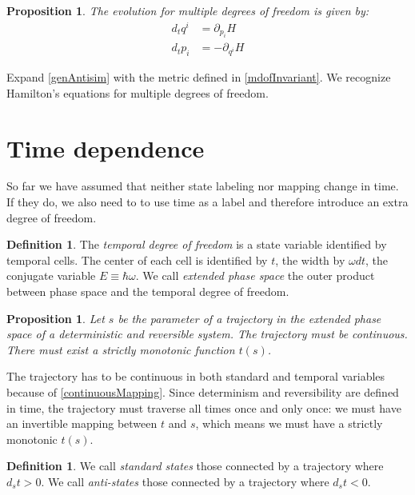 \documentclass[aps,pra,10pt,twocolumn,floatfix,nofootinbib]{revtex4-1}
\newtheorem{prop}[thm]{Proposition}
\theoremstyle{definition}
\newtheorem{defn}[thm]{Definition}
\begin{document}
\begin{prop}\label{mdofHam}
The evolution for multiple degrees of freedom is given by:
\begin{align*}
d_{t}q^i &= \partial_{p_i} H \\
d_{t}p_i &= - \partial_{q^i} H
\end{align*}
\end{prop}

Expand \ref{genAntisim} with the metric defined in \ref{mdofInvariant}. We recognize Hamilton's equations for multiple degrees of freedom\cite{classical_dynamics}.

\section{Time dependence}

So far we have assumed that neither state labeling nor mapping change in time. If they do, we also need to to use time as a label and therefore introduce an extra degree of freedom.

\begin{defn}\label{tdof}
The \emph{temporal degree of freedom} is a state variable identified by temporal cells. The center of each cell is identified by $t$, the width by $\omega dt$, the conjugate variable $E\equiv\hbar\omega$. We call \emph{extended phase space} the outer product between phase space and the temporal degree of freedom.
\end{defn}

\begin{prop}\label{tdofMonotonic}
Let $s$ be the parameter of a trajectory in the extended phase space of a deterministic and reversible system. The trajectory must be continuous. There must exist a strictly monotonic function $t(s)$.
\end{prop}

The trajectory has to be continuous in both standard and temporal variables because of \ref{continuousMapping}. Since determinism and reversibility are defined in time, the trajectory must traverse all times once and only once: we must have an invertible mapping between $t$ and $s$, which means we must have a strictly monotonic $t(s)$.

\begin{defn}\label{tdofAntistates}
We call \emph{standard states} those connected by a trajectory where $d_{s}t>0$. We call \emph{anti-states} those connected by a trajectory where $d_{s}t<0$.
\end{defn}
\end{document}
